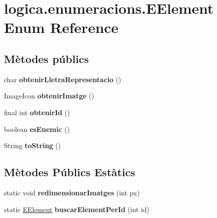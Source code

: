 \hypertarget{enumlogica_1_1enumeracions_1_1_e_element}{\section{logica.\+enumeracions.\+E\+Element Enum Reference}
\label{enumlogica_1_1enumeracions_1_1_e_element}
}
\subsection*{Mètodes públics}
\begin{DoxyCompactItemize}
\item 
\hypertarget{enumlogica_1_1enumeracions_1_1_e_element_a7a4bc5ca2a0a984a29cbc7bf9988d4aa}{char {\bfseries obtenir\+Lletra\+Representacio} ()}\label{enumlogica_1_1enumeracions_1_1_e_element_a7a4bc5ca2a0a984a29cbc7bf9988d4aa}

\item 
\hypertarget{enumlogica_1_1enumeracions_1_1_e_element_a9b55cc7b129ffff7c1c03aef465f32a7}{Image\+Icon {\bfseries obtenir\+Imatge} ()}\label{enumlogica_1_1enumeracions_1_1_e_element_a9b55cc7b129ffff7c1c03aef465f32a7}

\item 
\hypertarget{enumlogica_1_1enumeracions_1_1_e_element_ace3c605008e8ec150845687493323df2}{final int {\bfseries obtenir\+Id} ()}\label{enumlogica_1_1enumeracions_1_1_e_element_ace3c605008e8ec150845687493323df2}

\item 
\hypertarget{enumlogica_1_1enumeracions_1_1_e_element_abac9b105a574e82ffaac64636c40b8e8}{boolean {\bfseries es\+Enemic} ()}\label{enumlogica_1_1enumeracions_1_1_e_element_abac9b105a574e82ffaac64636c40b8e8}

\item 
\hypertarget{enumlogica_1_1enumeracions_1_1_e_element_a8f501522d71ec7107069a9f2d8faeb8b}{String {\bfseries to\+String} ()}\label{enumlogica_1_1enumeracions_1_1_e_element_a8f501522d71ec7107069a9f2d8faeb8b}

\end{DoxyCompactItemize}
\subsection*{Mètodes Públics Estàtics}
\begin{DoxyCompactItemize}
\item 
\hypertarget{enumlogica_1_1enumeracions_1_1_e_element_a463fe7d8bef930e62019d223bc2f0ed6}{static void {\bfseries redimensionar\+Imatges} (int px)}\label{enumlogica_1_1enumeracions_1_1_e_element_a463fe7d8bef930e62019d223bc2f0ed6}

\item 
\hypertarget{enumlogica_1_1enumeracions_1_1_e_element_a5bd957c7a226b8127a5ef222f7d5a869}{static \hyperlink{enumlogica_1_1enumeracions_1_1_e_element}{E\+Element} {\bfseries buscar\+Element\+Per\+Id} (int id)}\label{enumlogica_1_1enumeracions_1_1_e_element_a5bd957c7a226b8127a5ef222f7d5a869}

\end{DoxyCompactItemize}
